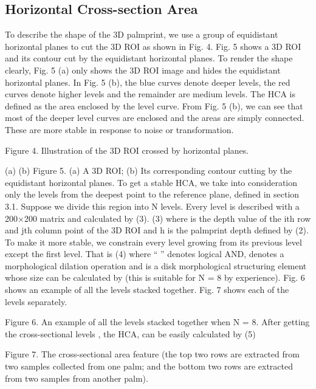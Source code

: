 \subsection{Horizontal Cross-section Area}
\label{ssec:methodology:hca}

To describe the shape of the 3D palmprint, we use a group of equidistant horizontal planes to cut the 3D ROI as shown in Fig. 4. Fig. 5 shows a 3D ROI and its contour cut by the equidistant horizontal planes. To render the shape clearly, Fig. 5 (a) only shows the 3D ROI image and hides the equidistant horizontal planes. In Fig. 5 (b), the blue curves denote deeper levels, the red curves denote higher levels and the remainder are medium levels. The HCA is defined as the area enclosed by the level curve. From Fig. 5 (b), we can see that most of the deeper level curves are enclosed and the areas are simply connected. These are more stable in response to noise or transformation.

Figure 4. Illustration of the 3D ROI crossed by horizontal planes.


(a)                                (b)
Figure 5. (a) A 3D ROI; (b) Its corresponding contour cutting by the equidistant horizontal planes.
To get a stable HCA, we take into consideration only the levels from the deepest point to the reference plane, defined in section 3.1. Suppose we divide this region into N levels. Every level   is described with a 200×200 matrix and calculated by (3).
          (3)
where   is the depth value of the ith row and jth column point of the 3D ROI and h is the palmprint depth defined by (2).
To make it more stable, we constrain every level growing from its previous level except the first level. That is
                      (4)
where “ ” denotes logical AND,   denotes a morphological dilation operation and   is a disk morphological structuring element whose size can be calculated by   (this is suitable for N = 8 by experience).
Fig. 6 shows an example of all the levels stacked together. Fig. 7 shows each of the levels separately.

Figure 6. An example of all the levels stacked together when N = 8.
After getting the cross-sectional levels  , the HCA,   can be easily calculated by
                                      (5)





Figure 7. The cross-sectional area feature (the top two rows are extracted from two samples collected from one palm; and the bottom two rows are extracted from two samples from another palm).
